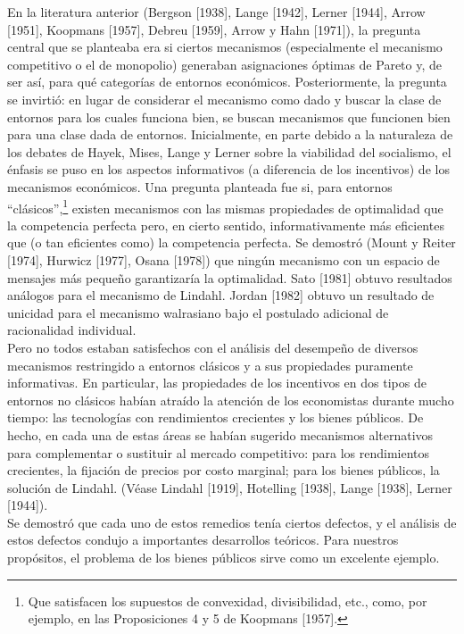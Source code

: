 \documentclass[12pt, letterpaper]{article}
\begin{document}
En la literatura anterior (Bergson [1938], Lange [1942], Lerner [1944], Arrow [1951], Koopmans [1957], Debreu [1959], Arrow y Hahn [1971]), la pregunta central que se planteaba era si ciertos mecanismos (especialmente el mecanismo competitivo o el de monopolio) generaban asignaciones óptimas de Pareto y, de ser así, para qué categorías de entornos económicos. Posteriormente, la pregunta se invirtió: en lugar de considerar el mecanismo como dado y buscar la clase de entornos para los cuales funciona bien, se buscan mecanismos que funcionen bien para una clase dada de entornos. Inicialmente, en parte debido a la naturaleza de los debates de Hayek, Mises, Lange y Lerner sobre la viabilidad del socialismo, el énfasis se puso en los aspectos informativos (a diferencia de los incentivos) de los mecanismos económicos. Una pregunta planteada fue si, para entornos ``clásicos'',\footnote{Que satisfacen los supuestos de convexidad, divisibilidad, etc., como, por ejemplo, en las Proposiciones 4 y 5 de Koopmans [1957].} existen mecanismos con las mismas propiedades de optimalidad que la competencia perfecta pero, en cierto sentido, informativamente más eficientes que (o tan eficientes como) la competencia perfecta. Se demostró (Mount y Reiter [1974], Hurwicz [1977], Osana [1978]) que ningún mecanismo con un espacio de mensajes más pequeño garantizaría la optimalidad. Sato [1981] obtuvo resultados análogos para el mecanismo de Lindahl. Jordan [1982] obtuvo un resultado de unicidad para el mecanismo walrasiano bajo el postulado adicional de racionalidad individual.
\\

Pero no todos estaban satisfechos con el análisis del desempeño de diversos mecanismos restringido a entornos clásicos y a sus propiedades puramente informativas. En particular, las propiedades de los incentivos en dos tipos de entornos no clásicos habían atraído la atención de los economistas durante mucho tiempo: las tecnologías con rendimientos crecientes y los bienes públicos. De hecho, en cada una de estas áreas se habían sugerido mecanismos alternativos para complementar o sustituir al mercado competitivo: para los rendimientos crecientes, la fijación de precios por costo marginal; para los bienes públicos, la solución de Lindahl. (Véase Lindahl [1919], Hotelling [1938], Lange [1938], Lerner [1944]). \\

Se demostró que cada uno de estos remedios tenía ciertos defectos, y el análisis de estos defectos condujo a importantes desarrollos teóricos. Para nuestros propósitos, el problema de los bienes públicos sirve como un excelente ejemplo. \\
\end{document}
